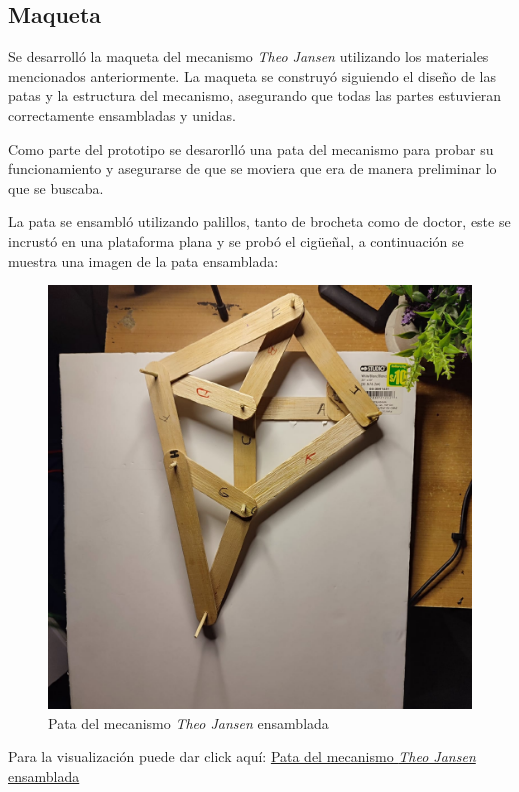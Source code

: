 \newpage
\subsection{Maqueta}

Se desarrolló la maqueta del mecanismo \textit{Theo Jansen} utilizando los materiales mencionados anteriormente. La maqueta se construyó siguiendo el diseño de las patas y la estructura del mecanismo, asegurando que todas las partes estuvieran correctamente ensambladas y unidas.

Como parte del prototipo se desarorlló una pata del mecanismo para probar su funcionamiento y asegurarse de que se moviera que era de manera preliminar lo que se buscaba.

La pata se ensambló utilizando palillos, tanto de brocheta como de doctor, este se incrustó en una plataforma plana y se probó el cigüeñal, a continuación se muestra una imagen de la pata ensamblada:

\begin{figure}[H]
  \centering
  \includegraphics[width=0.5\linewidth]{./assets/palillos.jpeg}
  \caption{Pata del mecanismo \textit{Theo Jansen} ensamblada}
  \label{fig:pata_ensamblada}
\end{figure}

Para la visualización puede dar click aquí: \href{https://www.youtube.com/watch?v=8b1k2Z3g0aY}{Pata del mecanismo \textit{Theo Jansen} ensamblada}
